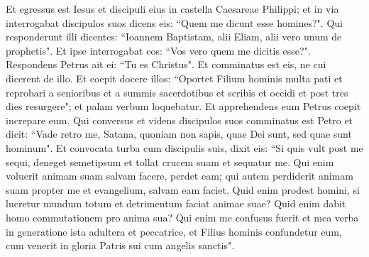 \begin{biblechapter}
\verse Et egressus est Iesus et discipuli eius in castella Caesareae Philippi; et in via interrogabat discipulos suos dicens eis: “Quem me dicunt esse homines?".  
\verse Qui responderunt illi dicentcs: “Ioannem Baptistam, alii Eliam, alii vero unum de prophetis". 
\verse Et ipse interrogabat eos: “Vos vero quem me dicitis esse?". Respondens Petrus ait ei: “Tu es Christus". 
\verse Et comminatus est eis, ne cui dicerent de illo. 
\verse Et coepit docere illos: “Oportet Filium hominis multa pati et reprobari a senioribus et a summis sacerdotibus et scribis et occidi et post tres dies resurgere"; 
\verse et palam verbum loquebatur. Et apprehendens eum Petrus coepit increpare eum. 
\verse Qui conversus et videns discipulos suos comminatus est Petro et dicit: “Vade retro me, Satana, quoniam non sapis, quae Dei sunt, sed quae sunt hominum". 
\verse Et convocata turba cum discipulis suis, dixit eis: “Si quis vult post me sequi, deneget semetipsum et tollat crucem suam et sequatur me. 
\verse Qui enim voluerit animam suam salvam facere, perdet eam; qui autem perdiderit animam suam propter me et evangelium, salvam eam faciet. 
\verse Quid enim prodest homini, si lucretur mundum totum et detrimentum faciat animae suae? 
\verse Quid enim dabit homo commutationem pro anima sua? 
\verse Qui enim me confusus fuerit et mea verba in generatione ista adultera et peccatrice, et Filius hominis confundetur eum, cum venerit in gloria Patris sui cum angelis sanctis". 
\end{biblechapter}

